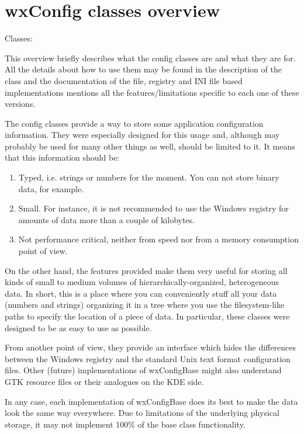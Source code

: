 \section{wxConfig classes overview}\label{wxconfigoverview}

Classes: 

This overview briefly describes what the config classes are and what they are
for. All the details about how to use them may be found in the description of
the  class and the documentation of the
file, registry and INI file based implementations mentions all the
features/limitations specific to each one of these versions.

The config classes provide a way to store some application configuration
information. They were especially designed for this usage and, although may
probably be used for many other things as well, should be limited to it. It
means that this information should be:

\begin{enumerate}\itemsep=0pt
\item Typed, i.e. strings or numbers for the moment. You can not store
binary data, for example.
\item Small. For instance, it is not recommended to use the Windows
registry for amounts of data more than a couple of kilobytes.
\item Not performance critical, neither from speed nor from a memory
consumption point of view.
\end{enumerate}

On the other hand, the features provided make them very useful for storing all
kinds of small to medium volumes of hierarchically-organized, heterogeneous
data. In short, this is a place where you can conveniently stuff all your data
(numbers and strings) organizing it in a tree where you use the
filesystem-like paths to specify the location of a piece of data. In
particular, these classes were designed to be as easy to use as possible.

From another point of view, they provide an interface which hides the
differences between the Windows registry and the standard Unix text format
configuration files. Other (future) implementations of wxConfigBase might also
understand GTK resource files or their analogues on the KDE side.

In any case, each implementation of wxConfigBase does its best to
make the data look the same way everywhere. Due to limitations of the underlying 
physical storage, it may not implement 100\% of the base class functionality.

